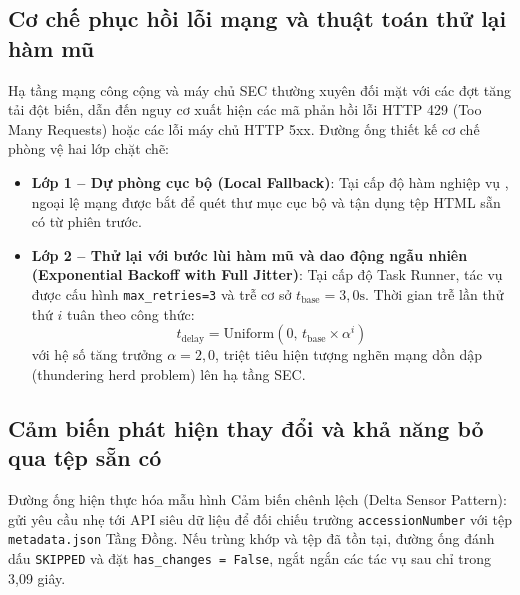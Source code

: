 \subsection{Cơ chế phục hồi lỗi mạng và thuật toán thử lại hàm mũ}
Hạ tầng mạng công cộng và máy chủ SEC thường xuyên đối mặt với các đợt tăng tải đột biến, dẫn đến nguy cơ xuất hiện các mã phản hồi lỗi HTTP 429 (Too Many Requests) hoặc các lỗi máy chủ HTTP 5xx. Đường ống thiết kế cơ chế phòng vệ hai lớp chặt chẽ:
\begin{itemize}
    \item \textbf{Lớp 1 -- Dự phòng cục bộ (Local Fallback)}: Tại cấp độ hàm nghiệp vụ , ngoại lệ mạng được bắt để quét thư mục cục bộ và tận dụng tệp HTML sẵn có từ phiên trước.
    \item \textbf{Lớp 2 -- Thử lại với bước lùi hàm mũ và dao động ngẫu nhiên (Exponential Backoff with Full Jitter)}: Tại cấp độ Task Runner, tác vụ được cấu hình \texttt{max\_retries=3} và trễ cơ sở $t_{\text{base}}=3,0\text{s}$. Thời gian trễ lần thử thứ $i$ tuân theo công thức:
    \begin{equation}
        t_{\text{delay}} = \text{Uniform}\left(0, \, t_{\text{base}} \times \alpha^i\right)
    \end{equation}
    với hệ số tăng trưởng $\alpha = 2,0$, triệt tiêu hiện tượng nghẽn mạng dồn dập (thundering herd problem) lên hạ tầng SEC.
\end{itemize}

\subsection{Cảm biến phát hiện thay đổi và khả năng bỏ qua tệp sẵn có}
Đường ống hiện thực hóa mẫu hình Cảm biến chênh lệch (Delta Sensor Pattern): gửi yêu cầu nhẹ tới API siêu dữ liệu để đối chiếu trường \texttt{accessionNumber} với tệp \texttt{metadata.json} Tầng Đồng. Nếu trùng khớp và tệp đã tồn tại, đường ống đánh dấu \texttt{SKIPPED} và đặt \texttt{has\_changes = False}, ngắt ngắn các tác vụ sau chỉ trong 3,09 giây.

